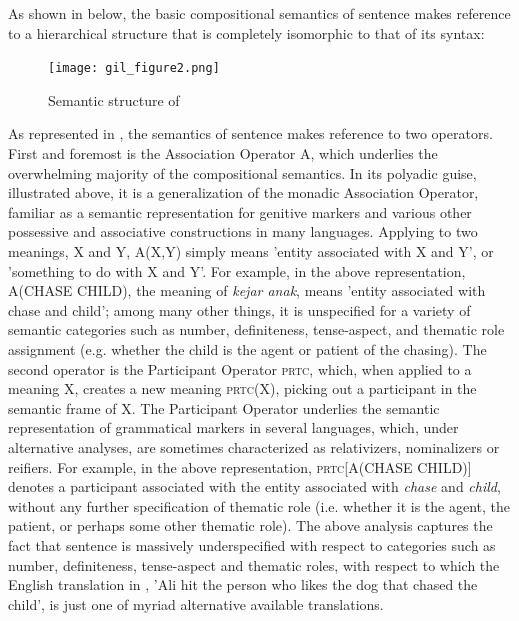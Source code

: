 \documentclass[output=paper,colorlinks,citecolor=brown
]{langscibook}
\begin{document}
As shown in  below, the basic compositional semantics of sentence  makes reference to a hierarchical structure that is completely isomorphic to that of its syntax:

\begin{figure}
\centering
\texttt{[image: gil\_figure2.png]}
\caption{\label{fig:gil:fig2}Semantic structure of }
\end{figure}

As represented in , the semantics of sentence  makes reference to two operators. First and foremost is the Association Operator A, which underlies the overwhelming majority of the compositional semantics. In its polyadic guise, illustrated above, it is a generalization of the monadic Association Operator, familiar as a semantic representation for genitive markers and various other possessive and associative constructions in many languages. Applying to two meanings, X and Y, A(X,Y) simply means 'entity associated with X and Y', or 'something to do with X and Y'. For example, in the above representation, A(CHASE CHILD), the meaning of \textit{kejar anak}, means 'entity associated with chase and child'; among many other things, it is unspecified for a variety of semantic categories such as number, definiteness, tense-aspect, and thematic role assignment (e.g. whether the child is the agent or patient of the chasing). The second operator is the Participant Operator \textsc{prtc}, which, when applied to a meaning X, creates a new meaning \textsc{prtc}(X), picking out a participant in the semantic frame of X. The Participant Operator underlies the semantic representation of grammatical markers in several languages, which, under alternative analyses, are sometimes characterized as relativizers, nominalizers or reifiers. For example, in the above representation, \textsc{prtc}[A(CHASE CHILD)] denotes a participant associated with the entity associated with \textit{chase} and \textit{child}, without any further specification of thematic role (i.e. whether it is the agent, the patient, or perhaps some other thematic role). The above analysis captures the fact that sentence  is massively underspecified with respect to categories such as number, definiteness, tense-aspect and thematic roles, with respect to which the English translation in , 'Ali hit the person who likes the dog that chased the child', is just one of myriad alternative available translations.
\end{document}
